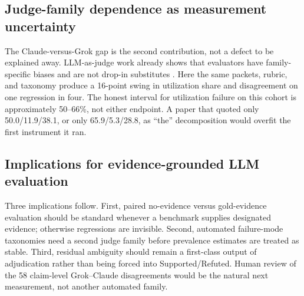 \subsection{Judge-family dependence as measurement uncertainty}
The Claude-versus-Grok gap is the second contribution, not a defect to be explained away.
LLM-as-judge work already shows that evaluators have family-specific biases and are not drop-in substitutes \citep{zheng2023judging,liu-etal-2023-g,chen-etal-2024-humans,huang-etal-2025-empirical}.
Here the same packets, rubric, and taxonomy produce a 16-point swing in utilization share and disagreement on one regression in four.
The honest interval for utilization failure on this cohort is approximately 50--66\%, not either endpoint.
A paper that quoted only 50.0/11.9/38.1, or only 65.9/5.3/28.8, as ``the'' decomposition would overfit the first instrument it ran.

\subsection{Implications for evidence-grounded LLM evaluation}
Three implications follow.
First, paired no-evidence versus gold-evidence evaluation should be standard whenever a benchmark supplies designated evidence; otherwise regressions are invisible.
Second, automated failure-mode taxonomies need a second judge family before prevalence estimates are treated as stable.
Third, residual ambiguity should remain a first-class output of adjudication rather than being forced into Supported/Refuted.
Human review of the 58 claim-level Grok--Claude disagreements would be the natural next measurement, not another automated family.
